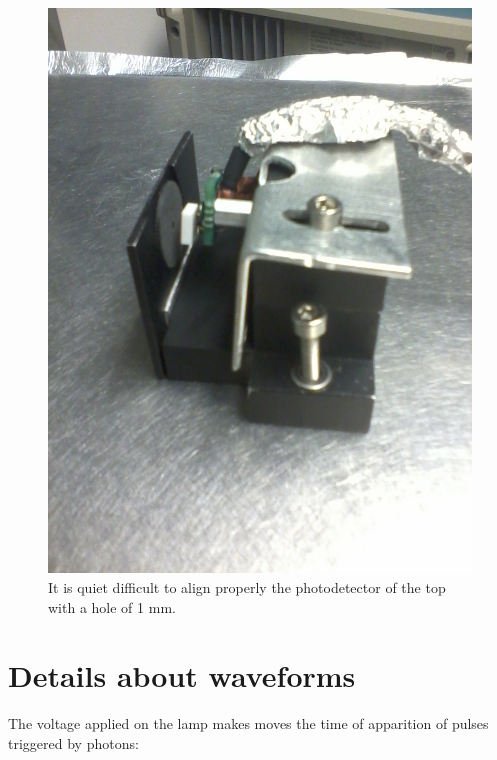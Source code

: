 \documentclass[a4paper, 11pt]{report}%
\begin{document}
  \begin{figure}[!hbtp]
    \centering
    \includegraphics[totalheight=0.5\textwidth,trim=5cm 0cm 10cm 0cm, clip=true, angle = 270]{../Pictures/Pictures_Setup/VUV2_top.jpg} 
    \caption{It is quiet difficult to align properly the photodetector of the top with a hole of 1 mm. }
    \label{fig:top_centered}
  \end{figure}
  
  \section{Details about waveforms}
  
  The voltage applied on the lamp makes moves the time of apparition of pulses triggered by photons:
    
\end{document}
